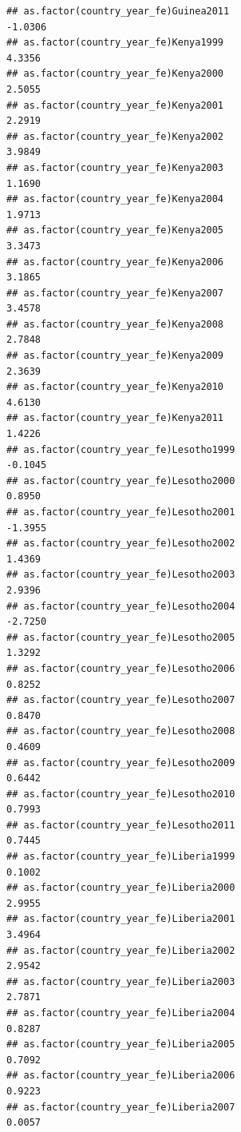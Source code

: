 \documentclass[
  a4paper,
]{article}
\begin{document}
\begin{verbatim}
## as.factor(country_year_fe)Guinea2011                           -1.0306
## as.factor(country_year_fe)Kenya1999                             4.3356
## as.factor(country_year_fe)Kenya2000                             2.5055
## as.factor(country_year_fe)Kenya2001                             2.2919
## as.factor(country_year_fe)Kenya2002                             3.9849
## as.factor(country_year_fe)Kenya2003                             1.1690
## as.factor(country_year_fe)Kenya2004                             1.9713
## as.factor(country_year_fe)Kenya2005                             3.3473
## as.factor(country_year_fe)Kenya2006                             3.1865
## as.factor(country_year_fe)Kenya2007                             3.4578
## as.factor(country_year_fe)Kenya2008                             2.7848
## as.factor(country_year_fe)Kenya2009                             2.3639
## as.factor(country_year_fe)Kenya2010                             4.6130
## as.factor(country_year_fe)Kenya2011                             1.4226
## as.factor(country_year_fe)Lesotho1999                          -0.1045
## as.factor(country_year_fe)Lesotho2000                           0.8950
## as.factor(country_year_fe)Lesotho2001                          -1.3955
## as.factor(country_year_fe)Lesotho2002                           1.4369
## as.factor(country_year_fe)Lesotho2003                           2.9396
## as.factor(country_year_fe)Lesotho2004                          -2.7250
## as.factor(country_year_fe)Lesotho2005                           1.3292
## as.factor(country_year_fe)Lesotho2006                           0.8252
## as.factor(country_year_fe)Lesotho2007                           0.8470
## as.factor(country_year_fe)Lesotho2008                           0.4609
## as.factor(country_year_fe)Lesotho2009                           0.6442
## as.factor(country_year_fe)Lesotho2010                           0.7993
## as.factor(country_year_fe)Lesotho2011                           0.7445
## as.factor(country_year_fe)Liberia1999                           0.1002
## as.factor(country_year_fe)Liberia2000                           2.9955
## as.factor(country_year_fe)Liberia2001                           3.4964
## as.factor(country_year_fe)Liberia2002                           2.9542
## as.factor(country_year_fe)Liberia2003                           2.7871
## as.factor(country_year_fe)Liberia2004                           0.8287
## as.factor(country_year_fe)Liberia2005                           0.7092
## as.factor(country_year_fe)Liberia2006                           0.9223
## as.factor(country_year_fe)Liberia2007                           0.0057

\end{verbatim}
\end{document}
